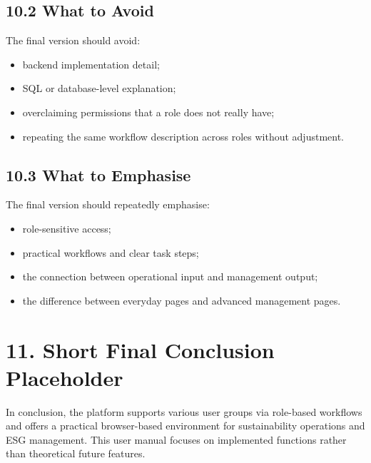 \documentclass[10pt,a4paper]{article}
\begin{document}
\subsection*{10.2 What to Avoid}
The final version should avoid:
\begin{itemize}[leftmargin=1.4em,itemsep=2pt,topsep=2pt]
    \item backend implementation detail;
    \item SQL or database-level explanation;
    \item overclaiming permissions that a role does not really have;
    \item repeating the same workflow description across roles without adjustment.
\end{itemize}

\subsection*{10.3 What to Emphasise}
The final version should repeatedly emphasise:
\begin{itemize}[leftmargin=1.4em,itemsep=2pt,topsep=2pt]
    \item role-sensitive access;
    \item practical workflows and clear task steps;
    \item the connection between operational input and management output;
    \item the difference between everyday pages and advanced management pages.
\end{itemize}

\section*{11. Short Final Conclusion Placeholder}
In conclusion, the platform supports various user groups via role-based workflows and offers a practical browser-based environment for sustainability operations and ESG management. This user manual focuses on implemented functions rather than theoretical future features.
\end{document}
